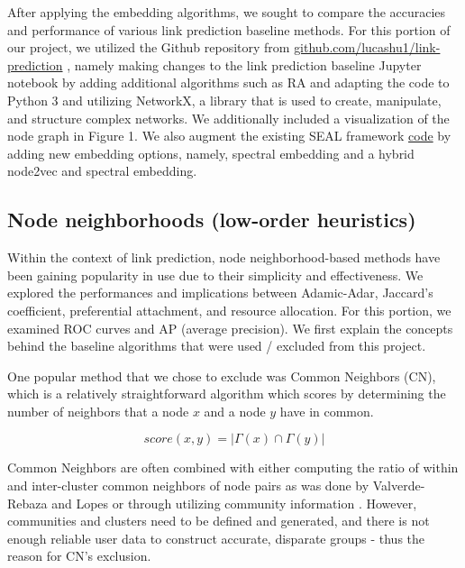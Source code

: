 \documentclass[10pt,twocolumn,letterpaper]{article}
\begin{document}
After applying the embedding algorithms, we sought to compare the accuracies and performance of various link prediction baseline methods. For this portion of our project, we utilized the Github repository from \href{https://github.com/lucashu1/link-prediction}{github.com/lucashu1/link-prediction} \cite{lucas-hu}, namely making changes to the link prediction baseline Jupyter notebook by adding additional algorithms such as RA and adapting the code to Python 3 and utilizing NetworkX, a library that is used to create, manipulate, and structure complex networks. We additionally included a visualization of the node graph in Figure 1. We also augment the existing SEAL framework \href{https://github.com/muhanzhang/SEAL}{code} \cite{SEAL} by adding new embedding options, namely, spectral embedding and a hybrid node2vec and spectral embedding.


\subsection{Node neighborhoods (low-order heuristics)}

Within the context of link prediction, node neighborhood-based methods have been gaining popularity in use due to their simplicity and effectiveness. We explored the performances and implications between Adamic-Adar, Jaccard's coefficient, preferential attachment, and resource allocation. For this portion, we examined ROC curves and AP (average precision).  We first explain the concepts behind the baseline algorithms that were used / excluded from this project.

One popular method that we chose to exclude was Common Neighbors (CN), which is a relatively straightforward algorithm which scores by determining the number of neighbors that a node $x$ and a node $y$ have in common. \cite{link-prediction-social-network}

\[
score(x, y) = |\Gamma(x) \cap \Gamma(y)| 
\]

Common Neighbors are often combined with either computing the ratio of within and inter-cluster common neighbors of node pairs as was done by Valverde-Rebaza and Lopes \cite{within-cluster-common-neighbor} or through utilizing community information \cite{community-common-neighbor}. However, communities and clusters need to be defined and generated, and there is not enough reliable user data to construct accurate, disparate groups - thus the reason for CN's exclusion.
\end{document}
